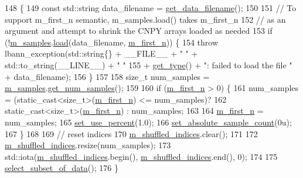 \begin{DoxyCode}
148                                \{
149   \textcolor{keyword}{const} std::string data\_filename = \hyperlink{classlbann_1_1generic__data__reader_a56664e1b43f3fe923cf6d652f14b40a9}{get\_data\_filename}();
150 
151   \textcolor{comment}{// To support m\_first\_n semantic, m\_samples.load() takes m\_first\_n}
152   \textcolor{comment}{// as an argument and attempt to shrink the CNPY arrays loaded as needed}
153   \textcolor{keywordflow}{if} (!\hyperlink{classlbann_1_1data__reader__triplet_a1f414c6d80f6e48fc91f98db0531f1f8}{m\_samples}.\hyperlink{classlbann_1_1offline__patches__npz_a29f1d64e32c857018d5ef21dd99fe7c4}{load}(data\_filename, \hyperlink{classlbann_1_1generic__data__reader_a51af253029b7daea29bc46cbbef686b3}{m\_first\_n})) \{
154     \textcolor{keywordflow}{throw} lbann\_exception(std::string\{\} + \_\_FILE\_\_ + \textcolor{stringliteral}{" "} + std::to\_string(\_\_LINE\_\_) + \textcolor{stringliteral}{" "}
155                           + \hyperlink{classlbann_1_1data__reader__triplet_a7ff627eed9a4671129cbf7fb9ca11871}{get\_type}() + \textcolor{stringliteral}{": failed to load the file "} + data\_filename);
156   \}
157 
158   \textcolor{keywordtype}{size\_t} num\_samples = \hyperlink{classlbann_1_1data__reader__triplet_a1f414c6d80f6e48fc91f98db0531f1f8}{m\_samples}.\hyperlink{classlbann_1_1offline__patches__npz_aa6fa05575f54a29b67d0bba8a2a9d363}{get\_num\_samples}();
159 
160   \textcolor{keywordflow}{if} (\hyperlink{classlbann_1_1generic__data__reader_a51af253029b7daea29bc46cbbef686b3}{m\_first\_n} > 0) \{
161     num\_samples = (\textcolor{keyword}{static\_cast<}\textcolor{keywordtype}{size\_t}\textcolor{keyword}{>}(\hyperlink{classlbann_1_1generic__data__reader_a51af253029b7daea29bc46cbbef686b3}{m\_first\_n}) <= num\_samples)?
162                    \textcolor{keyword}{static\_cast<}\textcolor{keywordtype}{size\_t}\textcolor{keyword}{>}(\hyperlink{classlbann_1_1generic__data__reader_a51af253029b7daea29bc46cbbef686b3}{m\_first\_n}) : num\_samples;
163 
164     \hyperlink{classlbann_1_1generic__data__reader_a51af253029b7daea29bc46cbbef686b3}{m\_first\_n} = num\_samples;
165     \hyperlink{classlbann_1_1generic__data__reader_ae6929a8bd2e59da72a8c2e537f0b2b37}{set\_use\_percent}(1.0);
166     \hyperlink{classlbann_1_1generic__data__reader_aa2d83c4ffc58534e0c193b6b9f9fb925}{set\_absolute\_sample\_count}(0u);
167   \}
168 
169   \textcolor{comment}{// reset indices}
170   \hyperlink{classlbann_1_1generic__data__reader_aaab6aeff67ffff1c689336851fec2c57}{m\_shuffled\_indices}.clear();
171 
172   \hyperlink{classlbann_1_1generic__data__reader_aaab6aeff67ffff1c689336851fec2c57}{m\_shuffled\_indices}.resize(num\_samples);
173   std::iota(\hyperlink{classlbann_1_1generic__data__reader_aaab6aeff67ffff1c689336851fec2c57}{m\_shuffled\_indices}.begin(), \hyperlink{classlbann_1_1generic__data__reader_aaab6aeff67ffff1c689336851fec2c57}{m\_shuffled\_indices}.end(), 0);
174 
175   \hyperlink{classlbann_1_1generic__data__reader_aa28fdeeb6af492540f507e49adff5d6c}{select\_subset\_of\_data}();
176 \}
\end{DoxyCode}
